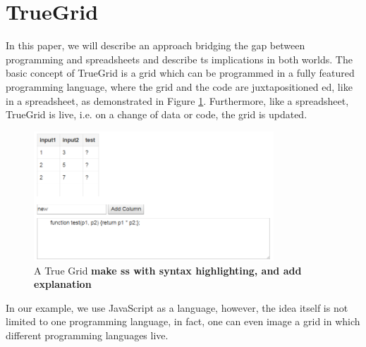 \documentclass{llncs}
\newcommand{\todo}[1]{\textbf{#1}}
\begin{document}


\section{TrueGrid}
In this paper, we will describe an approach bridging the gap between programming and spreadsheets and describe ts implications in both worlds. The basic concept of TrueGrid is a grid which can be programmed in a fully featured programming language, where the grid and the code are juxtapositioned ed, like in a spreadsheet, as demonstrated in Figure \ref{fig:TG}. Furthermore, like a spreadsheet, TrueGrid is live, i.e. on a change of data or code, the grid is updated.

\begin{figure}
  \begin{center}
  \includegraphics[width=9cm]{fig/TG.png}
  \caption{A True Grid \todo{make ss with syntax highlighting, and add explanation}}
  \label{fig:TG}
  \end{center}
\end{figure} 

In our example, we use JavaScript as a language, however, the idea itself is not limited to one programming language, in fact, one can even image a grid in which different programming languages live.
\end{document}
